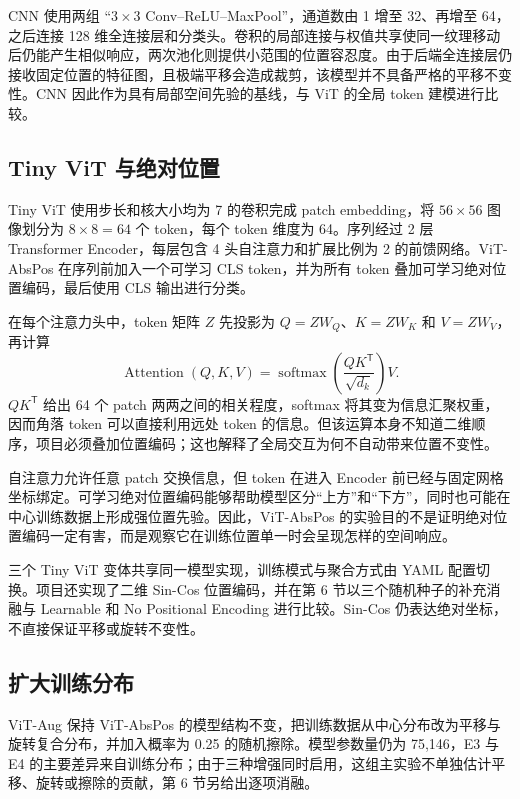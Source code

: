 CNN 使用两组 ``$3\times3$ Conv--ReLU--MaxPool''，通道数由 1 增至 32、再增至 64，之后连接 128 维全连接层和分类头。卷积的局部连接与权值共享使同一纹理移动后仍能产生相似响应，两次池化则提供小范围的位置容忍度。由于后端全连接层仍接收固定位置的特征图，且极端平移会造成裁剪，该模型并不具备严格的平移不变性。CNN 因此作为具有局部空间先验的基线，与 ViT 的全局 token 建模进行比较。

\subsection{Tiny ViT 与绝对位置}

Tiny ViT 使用步长和核大小均为 7 的卷积完成 patch embedding，将 $56\times56$ 图像划分为 $8\times8=64$ 个 token，每个 token 维度为 64。序列经过 2 层 Transformer Encoder，每层包含 4 头自注意力和扩展比例为 2 的前馈网络。ViT-AbsPos 在序列前加入一个可学习 CLS token，并为所有 token 叠加可学习绝对位置编码，最后使用 CLS 输出进行分类。

在每个注意力头中，token 矩阵 $Z$ 先投影为 $Q=ZW_Q$、$K=ZW_K$ 和 $V=ZW_V$，再计算
\[
  \operatorname{Attention}(Q,K,V)
  =\operatorname{softmax}\!\left(\frac{QK^{\mathsf T}}{\sqrt{d_k}}\right)V.
\]
$QK^{\mathsf T}$ 给出 64 个 patch 两两之间的相关程度，softmax 将其变为信息汇聚权重，因而角落 token 可以直接利用远处 token 的信息。但该运算本身不知道二维顺序，项目必须叠加位置编码；这也解释了全局交互为何不自动带来位置不变性。

自注意力允许任意 patch 交换信息，但 token 在进入 Encoder 前已经与固定网格坐标绑定。可学习绝对位置编码能够帮助模型区分“上方”和“下方”，同时也可能在中心训练数据上形成强位置先验。因此，ViT-AbsPos 的实验目的不是证明绝对位置编码一定有害，而是观察它在训练位置单一时会呈现怎样的空间响应。

三个 Tiny ViT 变体共享同一模型实现，训练模式与聚合方式由 YAML 配置切换。项目还实现了二维 Sin-Cos 位置编码，并在第 6 节以三个随机种子的补充消融与 Learnable 和 No Positional Encoding 进行比较。Sin-Cos 仍表达绝对坐标，不直接保证平移或旋转不变性。

\subsection{扩大训练分布}

ViT-Aug 保持 ViT-AbsPos 的模型结构不变，把训练数据从中心分布改为平移与旋转复合分布，并加入概率为 0.25 的随机擦除。模型参数量仍为 75,146，E3 与 E4 的主要差异来自训练分布；由于三种增强同时启用，这组主实验不单独估计平移、旋转或擦除的贡献，第 6 节另给出逐项消融。

